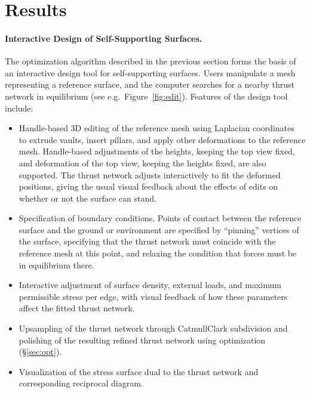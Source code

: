 \documentclass[annual]{acmsiggraph}
\newcommand{\secref}[1]{(\S\ref{#1})}
\begin{document}
\section{Results}
\label{sec:design}

\paragraph{Interactive Design of Self-Supporting Surfaces.}

The optimization algorithm described in the previous section forms the
basis of an interactive design tool for self-supporting surfaces. Users
manipulate a mesh representing a reference surface, and the computer
searches for a nearby thrust network in equilibrium (see e.g.\
Figure~\ref{fig:edit}). Features of the design tool include:

\begin{itemize}\itemsep-\parsep

\item Handle-based 3D editing of the reference mesh using Laplacian
coordinates~\cite{Lipman2004,Sorkine2003} to extrude vaults, insert
pillars, and apply other deformations to the reference mesh. Handle-based
adjustments of the heights, keeping the top view fixed, and deformation of
the top view, keeping the heights fixed, are also supported. The thrust
network adjusts interactively to fit the deformed positions, giving the
usual visual feedback about the effects of edits on whether or not the
surface can stand.

\item Specification of boundary conditions. Points of contact between the
reference surface and the ground or environment are specified by
``pinning'' vertices of the surface, specifying that the thrust network
must coincide with the reference mesh at this point, and relaxing the
condition that forces must be in equilibrium there.

\item Interactive adjustment of surface density, external loads,
and maximum permissible stress per edge, with visual
feedback of how these parameters affect the fitted thrust network.

\item Upsampling of the thrust network through Catmull\dash Clark
subdivision \nix{\cite{catmull78}}
and polishing of the resulting refined thrust
network using optimization \secref{sec:opt}.

\item Visualization of the stress surface dual to the thrust network
and corresponding reciprocal diagram.

\end{itemize}
\end{document}
